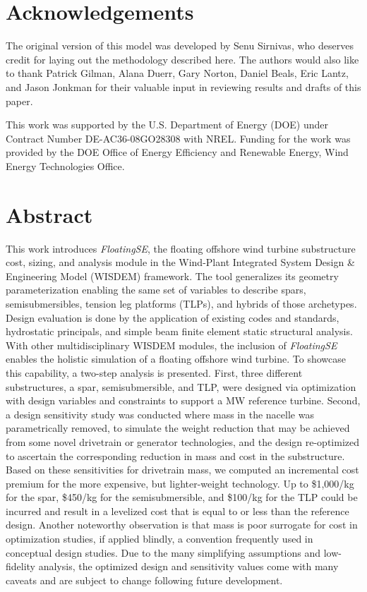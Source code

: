 \chapter*{Acknowledgements}
The original version of this model was developed by Senu Sirnivas, who
deserves credit for laying out the methodology described here.  The
authors would also like to thank Patrick Gilman, Alana Duerr, Gary
Norton, Daniel Beals, Eric Lantz, and Jason Jonkman for their valuable
input in reviewing results and drafts of this paper.

This work was supported by the U.S. Department of Energy (DOE) under
Contract Number DE-AC36-08GO28308 with NREL. Funding for the work was
provided by the DOE Office of Energy Efficiency and Renewable Energy,
Wind Energy Technologies Office.

\chapter*{Abstract}
This work introduces \textit{FloatingSE}, the floating offshore wind
turbine substructure cost, sizing, and analysis module in the Wind-Plant
Integrated System Design \& Engineering Model (WISDEM) framework.  The
tool generalizes its geometry parameterization enabling the same set of
variables to describe spars, semisubmersibles, tension leg platforms
(TLPs), and hybrids of those archetypes.  Design evaluation is done by
the application of existing codes and standards, hydrostatic principals,
and simple beam finite element static structural analysis.  With other
multidisciplinary WISDEM modules, the inclusion of \textit{FloatingSE}
enables the holistic simulation of a floating offshore wind turbine.  To
showcase this capability, a two-step analysis is presented.  First,
three different substructures, a spar, semisubmersible, and TLP, were
designed via optimization with design variables and constraints to
support a \unit[10]{MW} reference turbine. Second, a design sensitivity
study was conducted where mass in the nacelle was parametrically
removed, to simulate the weight reduction that may be achieved from some
novel drivetrain or generator technologies, and the design re-optimized
to ascertain the corresponding reduction in mass and cost in the
substructure.  Based on these sensitivities for drivetrain mass, we
computed an incremental cost premium for the more expensive, but
lighter-weight technology.  Up to \$1,000/kg for the spar, \$450/kg for
the semisubmersible, and \$100/kg for the TLP could be incurred and
result in a levelized cost that is equal to or less than the reference
design.  Another noteworthy observation is that mass is poor surrogate
for cost in optimization studies, if applied blindly, a convention
frequently used in conceptual design studies.  Due to the many
simplifying assumptions and low-fidelity analysis, the optimized design
and sensitivity values come with many caveats and are subject to change
following future development.
